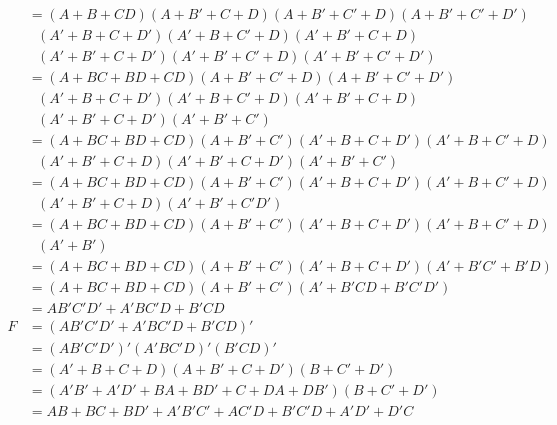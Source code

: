 \documentclass[12pt]{book}
\newenvironment{indented}[1] {
	\begin{list}{}{\setlength{\leftmargin}{#1}}
		\item[]
	}{\end{list}}
\begin{document}
\begin{indented}{5mm}
\begin{indented}{5mm}
			\pagebreak

			$\begin{aligned}
				&= (A+B+CD)(A+B'+C+D)(A+B'+C'+D)(A+B'+C'+D')\\
				&\text{\ \ \ \ }(A'+B+C+D')(A'+B+C'+D)(A'+B'+C+D)\\
				&\text{\ \ \ \ }(A'+B'+C+D')(A'+B'+C'+D)(A'+B'+C'+D')\\
				&= (A+BC+BD+CD)(A+B'+C'+D)(A+B'+C'+D')\\
				&\text{\ \ \ \ }(A'+B+C+D')(A'+B+C'+D)(A'+B'+C+D)\\
				&\text{\ \ \ \ }(A'+B'+C+D')(A'+B'+C')\\
				&= (A+BC+BD+CD)(A+B'+C')(A'+B+C+D')(A'+B+C'+D)\\
				&\text{\ \ \ \ }(A'+B'+C+D)(A'+B'+C+D')(A'+B'+C')\\
				&= (A+BC+BD+CD)(A+B'+C')(A'+B+C+D')(A'+B+C'+D)\\
				&\text{\ \ \ \ }(A'+B'+C+D)(A'+B'+C'D')\\
				&= (A+BC+BD+CD)(A+B'+C')(A'+B+C+D')(A'+B+C'+D)\\
				&\text{\ \ \ \ }(A'+B')\\
				&= (A+BC+BD+CD)(A+B'+C')(A'+B+C+D')(A'+B'C'+B'D)\\
				&= (A+BC+BD+CD)(A+B'+C')(A'+B'CD+B'C'D')\\
				&= AB'C'D' + A'BC'D + B'CD\\
				F&=(AB'C'D' + A'BC'D + B'CD)'\\
				&= (AB'C'D')'(A'BC'D)'(B'CD)'\\
				&= (A'+B+C+D)(A+B'+C+D')(B+C'+D')\\
				&= (A'B'+A'D'+BA+BD'+C+DA+DB')(B+C'+D')\\
				&= AB+BC+BD'+A'B'C'+AC'D+B'C'D+A'D'+D'C\\
			\end{aligned}$
		\end{indented}
	\end{indented}
\end{document}
